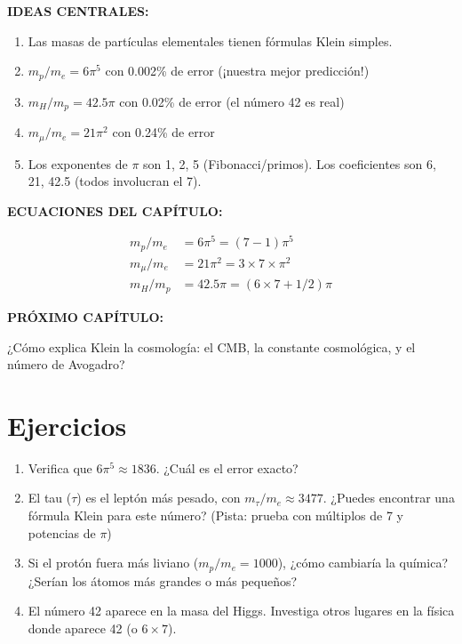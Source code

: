 \begin{tcolorbox}[colback=kleingray, colframe=kleinblue, title=\textbf{Resumen del Capítulo 5}]

\textbf{IDEAS CENTRALES:}

\begin{enumerate}
    \item Las masas de partículas elementales tienen fórmulas Klein simples.

    \item $m_p/m_e = 6\pi^5$ con 0.002\% de error (¡nuestra mejor predicción!)

    \item $m_H/m_p = 42.5\pi$ con 0.02\% de error (el número 42 es real)

    \item $m_\mu/m_e = 21\pi^2$ con 0.24\% de error

    \item Los exponentes de $\pi$ son 1, 2, 5 (Fibonacci/primos).
    Los coeficientes son 6, 21, 42.5 (todos involucran el 7).
\end{enumerate}

\vspace{0.3cm}
\textbf{ECUACIONES DEL CAPÍTULO:}

\begin{align}
m_p/m_e &= 6\pi^5 = (7-1)\pi^5\\
m_\mu/m_e &= 21\pi^2 = 3 \times 7 \times \pi^2\\
m_H/m_p &= 42.5\pi = (6 \times 7 + 1/2)\pi
\end{align}

\vspace{0.3cm}
\textbf{PRÓXIMO CAPÍTULO:}

¿Cómo explica Klein la cosmología: el CMB, la constante cosmológica,
y el número de Avogadro?

\end{tcolorbox}


\section*{Ejercicios}

\begin{enumerate}
    \item Verifica que $6\pi^5 \approx 1836$. ¿Cuál es el error exacto?

    \item El tau ($\tau$) es el leptón más pesado, con $m_\tau/m_e \approx 3477$.
    ¿Puedes encontrar una fórmula Klein para este número?
    (Pista: prueba con múltiplos de 7 y potencias de $\pi$)

    \item Si el protón fuera más liviano ($m_p/m_e = 1000$), ¿cómo cambiaría
    la química? ¿Serían los átomos más grandes o más pequeños?

    \item El número 42 aparece en la masa del Higgs. Investiga otros lugares
    en la física donde aparece 42 (o $6 \times 7$).
\end{enumerate}



